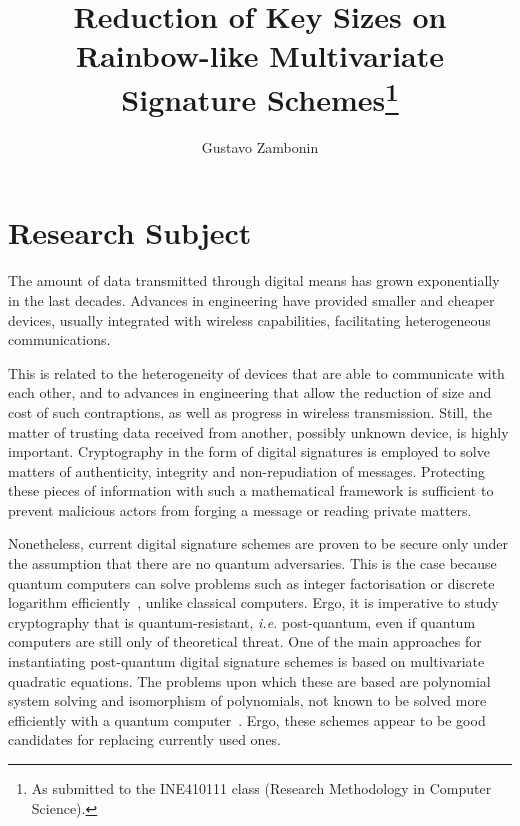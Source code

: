 \documentclass[10pt]{article}
\title{Reduction of Key Sizes on Rainbow-like Multivariate Signature Schemes\footnote{
    As submitted to the INE410111 class (Research Methodology in Computer Science).}}
\author{Gustavo Zambonin\inst{1}}
\begin{document}
 

\maketitle

\section{Research Subject}

The amount of data transmitted through digital means has grown exponentially in the last decades. Advances in engineering have provided smaller and cheaper devices, usually integrated with wireless capabilities, facilitating heterogeneous communications.


This is related to the heterogeneity of devices that are able to communicate with each other, and to advances in engineering that allow the reduction of size and cost of such contraptions, as well as progress in wireless transmission. Still, the matter of trusting data received from another, possibly unknown device, is highly important. Cryptography in the form of digital signatures is employed to solve matters of authenticity, integrity and non-repudiation of messages. Protecting these pieces of information with such a mathematical framework is sufficient to prevent malicious actors from forging a message or reading private matters.

Nonetheless, current digital signature schemes are proven to be secure only under the assumption that there are no quantum adversaries. This is the case because quantum computers can solve problems such as integer factorisation or discrete logarithm efficiently~\cite{Shor:article:1997:oct}, unlike classical computers. Ergo, it is imperative to study cryptography that is quantum-resistant, \emph{i.e.} post-quantum, even if quantum computers are still only of theoretical threat. One of the main approaches for instantiating post-quantum digital signature schemes is based on multivariate quadratic equations. The problems upon which these are based are polynomial system solving and isomorphism of polynomials, not known to be solved more efficiently with a quantum computer~\cite{Bernstein:book:2008}. Ergo, these schemes appear to be good candidates for replacing currently used ones.
\end{document}
